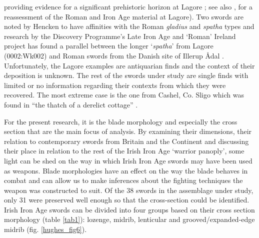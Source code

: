  providing evidence for a significant prehistoric horizon at Lagore 
 \parencite[32\psqq]{Carty2013}; see also \textcite{Gugliemi}, for a reassessment of the Roman and Iron Age material at Lagore). 
 Two swords are noted by Hencken to have affinities with the Roman \emph{gladius} and \emph{spatha} types \parencite[91; sword numbers 0002:Wk002 and 0003:Wk003, appendix 1]{Hencken1950}
  and research by the Discovery Programme’s Late Iron Age and ‘Roman’ Ireland project has found a parallel between the longer ‘\emph{spatha}’ from Lagore (0002:Wk002) and Roman swords from the Danish site of Illerup Ådal \parencite[28]{CahillWilson2014}. 
  Unfortunately, the Lagore examples are antiquarian finds and the context of their deposition is unknown.
The rest of the swords under study are single finds with limited or no information regarding their contexts from which they were recovered. 
The most extreme case is the one from Cashel, Co. Sligo which was found in “the thatch of a derelict cottage” \parencite[92]{Raftery1983}.

For the present research, it is the blade morphology and especially the cross section that are the main focus of analysis. 
By examining their dimensions, their relation to contemporary swords from Britain and the Continent and discussing their place in relation to the rest of the Irish Iron Age ‘warrior panoply’, some light can be shed on the way in which Irish Iron Age swords may have been used as weapons. 
Blade morphologies have an effect on the way the blade behaves in combat and can allow us to make inferences about the fighting techniques the weapon was constructed to suit. 
Of the 38 swords in the assemblage under study, only 31 were preserved well enough so that the cross-section could be identified. 
Irish Iron Age swords can be divided into four groups based on their cross section morphology (table \ref{tab1}): lozenge, midrib, lenticular and grooved/expanded-edge midrib (fig. \ref{hughes_fig6}). 




